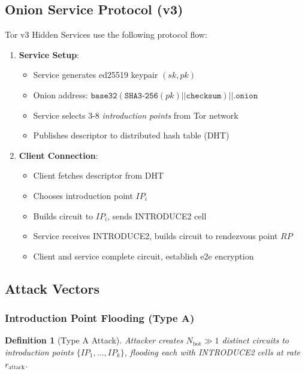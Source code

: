 \documentclass[11pt,a4paper]{article}
\newtheorem{definition}{Definition}[section]
\begin{document}
\subsection{Onion Service Protocol (v3)}

Tor v3 Hidden Services use the following protocol flow:

\begin{enumerate}
\item \textbf{Service Setup}:
\begin{itemize}
\item Service generates ed25519 keypair $(sk, pk)$
\item Onion address: $\texttt{base32}(\texttt{SHA3-256}(pk) || \texttt{checksum}) || \texttt{.onion}$
\item Service selects 3-8 \textit{introduction points} from Tor network
\item Publishes descriptor to distributed hash table (DHT)
\end{itemize}

\item \textbf{Client Connection}:
\begin{itemize}
\item Client fetches descriptor from DHT
\item Chooses introduction point $IP_i$
\item Builds circuit to $IP_i$, sends INTRODUCE2 cell
\item Service receives INTRODUCE2, builds circuit to rendezvous point $RP$
\item Client and service complete circuit, establish e2e encryption
\end{itemize}
\end{enumerate}

\subsection{Attack Vectors}

\subsubsection{Introduction Point Flooding (Type A)}

\begin{definition}[Type A Attack]
Attacker creates $N_{\text{bot}} \gg 1$ distinct circuits to introduction points $\{IP_1, \ldots, IP_k\}$, flooding each with INTRODUCE2 cells at rate $r_{\text{attack}}$.
\end{definition}
\end{document}
